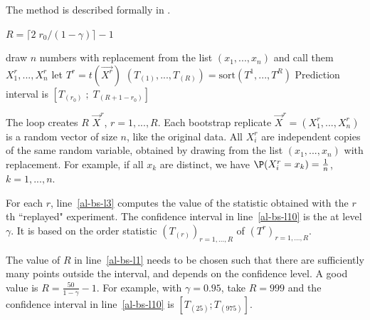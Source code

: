 The method is described formally in
.
\begin{algorithm}
 \begin{algorithmic}[1]
%
  \State $R=\lceil 2 \;r_0/(1-\gamma)\rceil-1$ \label{al-bs-l1}

    \State draw $n$ numbers with replacement from
the list $(x_1, ...,x_n)$ and call them
$X^r_{1},...,X^r_{n}$ \label{line-draw-xr}
    \State let $T^r=t(\vec{X^r})$ \label{al-bs-l3}
  \EndFor
  \State $\left(T_{(1)},...,T_{(R)}\right)=\mbox{sort}\left(T^1 ,...,T^R\right)$
  \State Prediction interval is
  $[T_{(r_0)}\;;\;T_{(R+1-r_0)}]$ \label{al-bs-l10}
\end{algorithmic}\label{algo-bs}
 \end{algorithm}
The loop creates $R$  $\vec{X}^r$,
$r=1,...,R$. Each bootstrap replicate
$\vec{X}^r=(X^r_1,...,X^r_n)$ is a random vector of size $n$,
like the original data. All $X^r_i$ are independent copies of
the same random variable, obtained by drawing from the list
$(x_1,...,x_n)$ with replacement. For example, if all
$x_k$ are distinct, we have $\P(X^r_i=x_k)=\frac{1}{n}$,
$k=1,...,n$.

For each $r$, line~\ref{al-bs-l3} computes the
value of the statistic obtained with the $r$th
``replayed" experiment. The confidence interval
in line~\ref{al-bs-l10} is the  at level $\gamma$. It is
based on the order statistic
$(T_{(r)})_{r=1,...,R}$ of $(T^r)_{r=1,...,R}$.

The value of $R$ in line~\ref{al-bs-l1} needs to be chosen such
that there are sufficiently many points outside the interval,
and depends on the confidence level. A good value is
$R=\frac{50}{1-\gamma}-1$. For example, with $\gamma=0.95$,
take $R=999$ and the confidence interval in
line~\ref{al-bs-l10} is $\left[T_{(25)};T_{(975)}\right]$.

